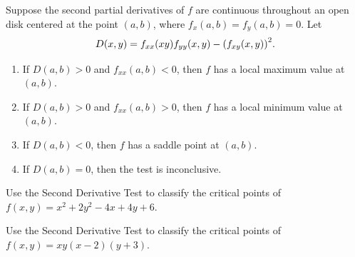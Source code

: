 \documentclass[mathNotesPreamble]{subfiles}
\begin{document}
  \begin{thmBox*}
    Suppose the second partial derivatives of $f$ are continuous throughout an open disk centered at the point $(a,b)$, where $f_x(a,b)=f_y(a,b)=0$. Let 
      \[D(x,y)=f_{xx}(xy) f_{yy}(x,y)-{\left(f_{xy}(x,y)\right)}^2.\]
    \begin{enumerate}
      \item 
        If $D(a,b) > 0$ and $f_{xx}(a,b) < 0$, then $f$ has a local maximum value at $(a,b)$.
      \item 
        If $D(a,b) > 0$ and $f_{xx}(a,b) > 0$, then $f$ has a local minimum value at $(a,b)$.
      \item 
        If $D(a,b) <0$, then $f$ has a saddle point at $(a,b)$.
      \item 
        If $D(a,b)=0$, then the test is inconclusive.
    \end{enumerate}
  \end{thmBox*}
  \pagebreak

  \begin{ex*}
    Use the Second Derivative Test to classify the critical points of \newline
    $f(x,y)=x^2+2y^2-4x+4y+6$.
  \end{ex*}

  \begin{ex*}
    Use the Second Derivative Test to classify the critical points of \newline
    $f(x,y)=xy(x-2)(y+3)$.
  \end{ex*}
  \pagebreak
\end{document}
